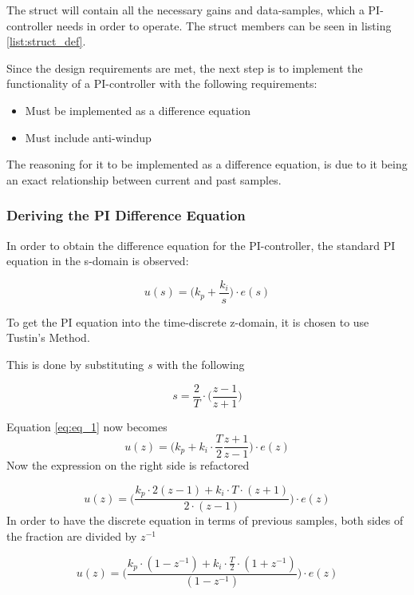 \documentclass[../../../main]{subfiles}
\begin{document}
The struct will contain all the necessary gains and data-samples, which a PI-controller needs in order to operate.
The struct members can be seen in listing \ref{list:struct_def}.


Since the design requirements are met, the next step is to implement the functionality of a PI-controller with the following requirements:
\begin{itemize}
    \item Must be implemented as a difference equation
    \item Must include anti-windup
\end{itemize}
The reasoning for it to be implemented as a difference equation, is due to it being an exact relationship between current and past samples.

\subsubsection{Deriving the PI Difference Equation}

In order to obtain the difference equation for the PI-controller, the standard PI equation in the s-domain is observed:

\begin{equation}
  u(s) = \Bigg(k_p + \frac{k_i}{s} \Bigg) \cdot e(s) \label{eq:eq_1}
\end{equation}


To get the PI equation into the time-discrete z-domain, it is chosen to use Tustin's Method.

This is done by substituting $s$ with the following

$$
s = \frac{2}{T}\cdot \Bigg( \frac{z-1}{z+1}\Bigg)
$$

Equation \eqref{eq:eq_1} now becomes
$$
  u(z) = \Bigg(k_p + k_i\cdot \frac{T}{2} \frac{z+1}{z-1} \Bigg) \cdot e(z)
$$
Now the expression on the right side is refactored

$$
  u(z) = \Bigg( \frac{k_p \cdot 2(z-1) + k_i \cdot T \cdot (z+1)}{2\cdot (z-1)}\Bigg) \cdot e(z)
$$
In order to have the discrete equation in terms of previous samples, both sides of the fraction are divided by $z^{-1}$

$$
  u(z) = \Bigg( \frac{k_p \cdot(1-z^{-1}) + k_i \cdot \frac{T}{2} \cdot (1+z^{-1}) }{(1-z^{-1})}\Bigg) \cdot e(z)
$$
\end{document}
